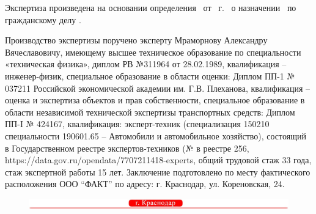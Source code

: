 %
Экспертиза произведена на основании  определения   \sud  \,  от \, \dataopr г. \, о назначении \opr \, по гражданскому делу \delonum.


Производство экспертизы поручено эксперту   Мраморнову Александру Вячеславовичу, имеющему высшее техническое образование по специальности «техническая физика», диплом РВ №311964 от 28.02.1989, квалификация -- инженер-физик, специальное образование в области оценки: Диплом ПП-1 № 037211 Российской экономической академии им. Г.В. Плеханова, квалификация -- оценка и экспертиза объектов и прав собственности, специальное образование в области независимой технической экспертизы транспортных средств: Диплом ПП-I № 424167, квалификация: эксперт-техник (специализация 150210 специальности 190601.65 – Автомобили и автомобильное хозяйство), состоящий в Государственном реестре экспертов-техников (№ в реестре 256, https://data.gov.ru/opendata/7707211418-experts,  общий трудовой  стаж 33 года, стаж  экспертной работы  15 лет.
Заключение подготовлено по месту фактического расположения ООО \enquote{ФАКТ} по адресу: г. Краснодар, ул. Кореновская, 24.

% 
 \begin{figure}[b]
 	\centering
 	\includegraphics[width=1\linewidth]{images/fakt/низ_лого}
 \end{figure}
% 